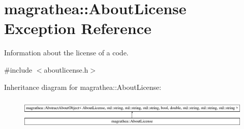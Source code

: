 \hypertarget{exceptionmagrathea_1_1AboutLicense}{\section{magrathea\-:\-:About\-License Exception Reference}
\label{exceptionmagrathea_1_1AboutLicense}
}


Information about the license of a code.  




{\ttfamily \#include $<$aboutlicense.\-h$>$}

Inheritance diagram for magrathea\-:\-:About\-License\-:\begin{figure}[H]
\begin{center}
\leavevmode
\includegraphics[height=1.483444cm]{exceptionmagrathea_1_1AboutLicense}
\end{center}
\end{figure}
